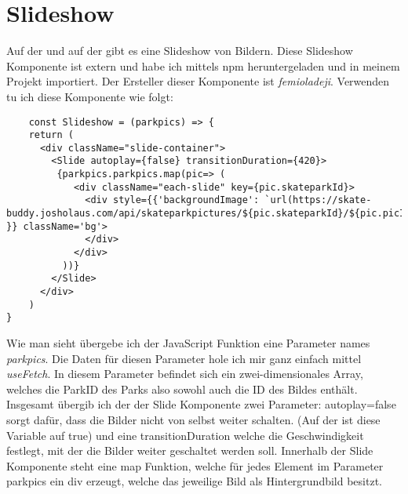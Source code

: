 \section{Slideshow}
\label{slideshow}

Auf der  und auf der  gibt es eine Slideshow von Bildern.
Diese Slideshow Komponente ist extern und habe ich mittels npm heruntergeladen und in meinem 
Projekt importiert. Der Ersteller dieser Komponente ist \textit{femioladeji}. Verwenden tu ich diese 
Komponente wie folgt:

\begin{lstlisting}
    const Slideshow = (parkpics) => {
    return (
      <div className="slide-container">
        <Slide autoplay={false} transitionDuration={420}>
         {parkpics.parkpics.map(pic=> (
            <div className="each-slide" key={pic.skateparkId}>
              <div style={{'backgroundImage': `url(https://skate-buddy.josholaus.com/api/skateparkpictures/${pic.skateparkId}/${pic.picId})` }} className='bg'>
              </div>
            </div>
          ))} 
        </Slide>
      </div>
    )
}
\end{lstlisting}

Wie man sieht übergebe ich der JavaScript Funktion eine Parameter names \textit{parkpics}. Die 
Daten für diesen Parameter hole ich mir ganz einfach mittel \textit{useFetch}. In diesem Parameter 
befindet sich ein zwei-dimensionales Array, welches die ParkID des Parks also sowohl auch die ID des 
Bildes enthält. Insgesamt übergib ich der der Slide Komponente zwei Parameter: autoplay={false} sorgt
dafür, dass die Bilder nicht von selbst weiter schalten. (Auf der  ist diese Variable auf true) und
eine transitionDuration welche die Geschwindigkeit festlegt, mit der die Bilder weiter geschaltet werden soll.
Innerhalb der Slide Komponente steht eine map Funktion, welche für jedes Element im Parameter parkpics 
ein div erzeugt, welche das jeweilige Bild als Hintergrundbild besitzt. 



